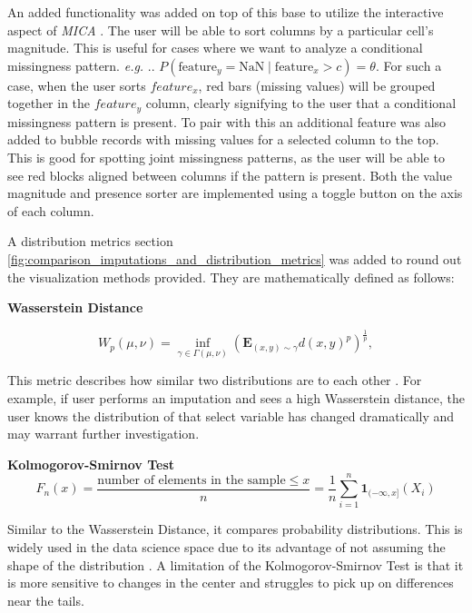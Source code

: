\documentclass[a4paper, 11pt]{article}
\makeatletter
\newcommand{\eg}{\emph{e.g. }\@ifnextchar.{\!\@gobble}{}}
\newcommand{\mica}{\textit{MICA }}
\makeatother
\begin{document}
An added functionality was added on top of this base to utilize the interactive
aspect of \mica. The user will be able to sort columns by a particular cell's
magnitude. This is useful for cases where we want to analyze a conditional
missingness pattern. \eg. $P(\text{feature}_y = \text{NaN} \mid
\text{feature}_x > c) = \theta$. For such a case, when the user sorts
$feature_x$, red bars (missing values) will be grouped together in the
$feature_y$ column, clearly signifying to the user that a conditional
missingness pattern is present. To pair with this an additional feature was
also added to bubble records with missing values for a selected column to the
top. This is good for spotting joint missingness patterns, as the user will be
able to see red blocks aligned between columns if the pattern is present. Both
the value magnitude and presence sorter are implemented using a toggle button
on the axis of each column.

A distribution metrics section 
\label{distribution_metrics_sec}
\cref{fig:comparison_imputations_and_distribution_metrics} was added to round
out the visualization methods provided. They are mathematically defined as follows: 

\textbf{Wasserstein Distance}

\begin{equation}
\label{wasserstein}
{\displaystyle W_{p}(\mu ,\nu )=\inf _{\gamma \in \Gamma (\mu ,\nu
)}\left(\mathbf {E} _{(x,y)\sim \gamma }d(x,y)^{p}\right)^{\frac {1}{p}},}
\end{equation}

This metric describes how similar two distributions are to each other
\cite[p~93]{villani_optimal_2009}. For example, if user performs an imputation
and sees a high Wasserstein distance, the user knows the distribution of that
select variable has changed dramatically and may warrant further investigation.

\textbf{Kolmogorov-Smirnov Test} 
\begin{equation}
F_{n}(x) = \frac{\text{number of elements in the sample} \leq x}{n} =
\frac{1}{n} \sum_{i=1}^{n} \mathbf{1}_{(-\infty, x]}(X_{i})
\end{equation}

Similar to the Wasserstein Distance, it compares probability distributions.
This is widely used in the data science space due to its advantage of not
assuming the shape of the distribution \cite{massey_kolmogorov-smirnov_1951}. A
limitation of the Kolmogorov-Smirnov Test is that it is more sensitive to
changes in the center and struggles to pick up on differences near the tails.
\end{document}
